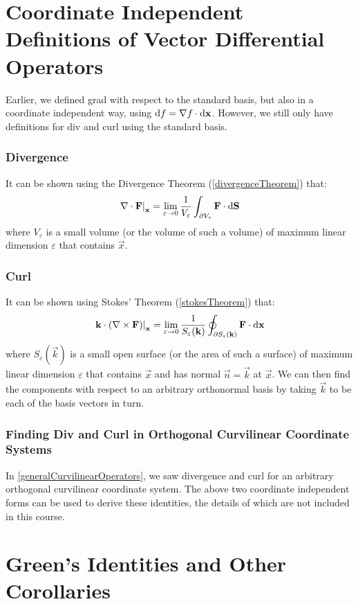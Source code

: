\documentclass[../main.tex]{subfiles}
\begin{document}
\section{Coordinate Independent Definitions of Vector Differential Operators}
\nonexaminable
Earlier, we defined grad with respect to the standard basis, but also in a coordinate independent way, using $\d{f} = \nabla f \cdot \d{\vec{x}}$.
However, we still only have definitions for div and curl using the standard basis.

\subsubsection{Divergence}
It can be shown using the Divergence Theorem (\cref{divergenceTheorem}) that:
\[
  \at{\nabla \cdot \vec{F}}{\vec{x}} = \lim_{\varepsilon \to 0} \frac{1}{V_\varepsilon} \int_{\partial V_\varepsilon} \vec{F}\cdot \d{\vec{S}}
\]
where $V_\varepsilon$ is a small volume (or the volume of such a volume) of maximum linear dimension $\varepsilon$ that contains $\vec{x}$.
\subsubsection{Curl}
It can be shown using Stokes' Theorem (\cref{stokesTheorem}) that:
\[
  \at{\vec{k} \cdot (\nabla \times \vec{F})}{\vec{x}} = \lim_{\varepsilon \to 0} \frac{1}{S_\varepsilon(\vec{k})} \oint_{\partial S_\varepsilon(\vec{k})} \vec{F} \cdot \d{\vec{x}}
\]
where $S_\varepsilon(\vec{k})$ is a small open surface (or the area of such a surface) of maximum linear dimension $\varepsilon$ that contains $\vec{x}$ and has normal $\vec{n} = \vec{k}$ at $\vec{x}$.
We can then find the components with respect to an arbitrary orthonormal basis by taking $\vec{k}$ to be each of the basis vectors in turn.
\subsubsection{Finding Div and Curl in Orthogonal Curvilinear Coordinate Systems}
In \cref{generalCurvilinearOperators}, we saw divergence and curl for an arbitrary orthogonal curvilinear coordinate system.
The above two coordinate independent forms can be used to derive these identities, the details of which are not included in this course.
\section{Green's Identities and Other Corollaries}
\end{document}
